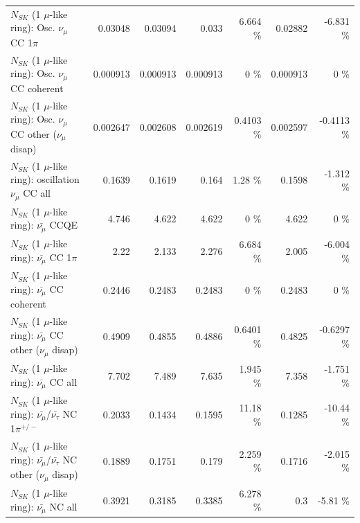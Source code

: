 \begin{table}
\begin{tabular}{| l | r | r | r  r | r  r |}
                          $N_{SK}$ (1 $\mu$-like ring): Osc. $\nu_\mu$ CC 1$\pi$ &         0.03048 &         0.03094 &           0.033 &    6.664 \%  &         0.02882 &   -6.831 \%  \\ 
                        $N_{SK}$ (1 $\mu$-like ring): Osc. $\nu_\mu$ CC coherent &        0.000913 &        0.000913 &        0.000913 &        0 \%  &        0.000913 &        0 \%  \\ 
         $N_{SK}$ (1 $\mu$-like ring): Osc. $\nu_\mu$ CC other ($\nu_\mu$ disap) &        0.002647 &        0.002608 &        0.002619 &   0.4103 \%  &        0.002597 &  -0.4113 \%  \\ 
                      $N_{SK}$ (1 $\mu$-like ring): oscillation $\nu_\mu$ CC all &          0.1639 &          0.1619 &           0.164 &     1.28 \%  &          0.1598 &   -1.312 \%  \\ 
\hline
\hline
                              $N_{SK}$ (1 $\mu$-like ring): $\bar{\nu_\mu}$ CCQE &           4.746 &           4.622 &           4.622 &        0 \%  &           4.622 &        0 \%  \\ 
                         $N_{SK}$ (1 $\mu$-like ring): $\bar{\nu_\mu}$ CC 1$\pi$ &            2.22 &           2.133 &           2.276 &    6.684 \%  &           2.005 &   -6.004 \%  \\ 
                       $N_{SK}$ (1 $\mu$-like ring): $\bar{\nu_\mu}$ CC coherent &          0.2446 &          0.2483 &          0.2483 &        0 \%  &          0.2483 &        0 \%  \\ 
        $N_{SK}$ (1 $\mu$-like ring): $\bar{\nu_\mu}$ CC other ($\nu_\mu$ disap) &          0.4909 &          0.4855 &          0.4886 &   0.6401 \%  &          0.4825 &  -0.6297 \%  \\ 
                          $N_{SK}$ (1 $\mu$-like ring): $\bar{\nu_{\mu}}$ CC all &           7.702 &           7.489 &           7.635 &    1.945 \%  &           7.358 &   -1.751 \%  \\ 
\hline
  $N_{SK}$ (1 $\mu$-like ring): $\bar{\nu_\mu}$/$\bar{\nu_\tau}$ NC 1$\pi^{+/-}$ &          0.2033 &          0.1434 &          0.1595 &    11.18 \%  &          0.1285 &   -10.44 \%  \\ 
$N_{SK}$ (1 $\mu$-like ring): $\bar{\nu_\mu}$/$\bar{\nu_\tau}$ NC other ($\nu_\mu$ disap) &          0.1889 &          0.1751 &           0.179 &    2.259 \%  &          0.1716 &   -2.015 \%  \\ 
                          $N_{SK}$ (1 $\mu$-like ring): $\bar{\nu_{\mu}}$ NC all &          0.3921 &          0.3185 &          0.3385 &    6.278 \%  &             0.3 &    -5.81 \%  \\ 

\end{tabular}
\end{table}
